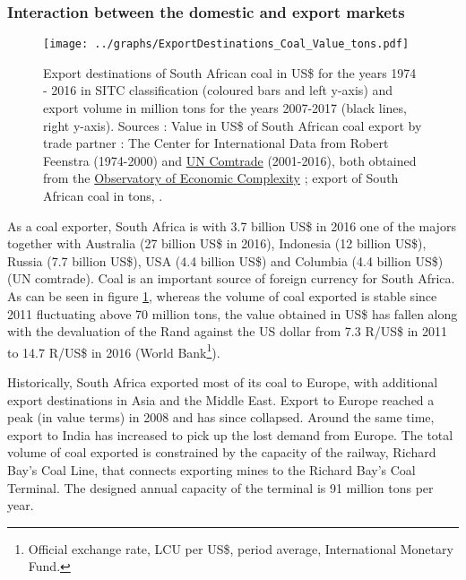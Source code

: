 \documentclass[12pt,english]{article}
\begin{document}
\subsubsection{Interaction between the domestic and export markets}

\begin{figure}[!t]
	\hspace{-20pt}\texttt{[image: ../graphs/ExportDestinations\_Coal\_Value\_tons.pdf]}
	\caption{\label{ExportDestinations_Coal}\small Export destinations of South African coal in US\$ for the years 1974 - 2016 in SITC classification (coloured bars and left y-axis) and export volume in million tons for the years 2007-2017 (black lines, right y-axis). Sources : Value in US\$ of South African coal export by trade partner : The Center for International Data from Robert Feenstra \citep{feenstra2005world} (1974-2000) and \href{https://comtrade.un.org/}{UN Comtrade} (2001-2016), both obtained from the \href{https://atlas.media.mit.edu/en/visualize/line/sitc/export/zaf/show/3222/1962.2016/}{Observatory of Economic Complexity} ; export of South African coal in tons, .}
\end{figure}

As a coal exporter, South Africa is with 3.7 billion US\$ in 2016 one of the majors together with Australia (27 billion US\$ in 2016), Indonesia (12 billion US\$), Russia (7.7 billion US\$), USA (4.4 billion US\$) and Columbia (4.4 billion US\$) (UN comtrade). Coal is an important source of foreign currency for South Africa. %
As can be seen in figure \ref{ExportDestinations_Coal}, whereas the volume of coal exported is stable since 2011 fluctuating above 70 million tons, the value obtained in US\$ has fallen along with the devaluation of the Rand against the US dollar from 7.3 R/US\$ in 2011 to 14.7 R/US\$ in 2016 (World Bank\footnote{Official exchange rate, LCU per US\$, period average, International Monetary Fund.}). 

Historically, South Africa exported most of its coal to Europe, with additional export destinations in Asia and the Middle East. Export to Europe reached a peak (in value terms) in 2008 and has since collapsed. Around the same time, export to India has increased to pick up the lost demand from Europe. The total volume of coal exported is constrained by the capacity of the railway, Richard Bay's Coal Line, that connects exporting mines to the Richard Bay's Coal Terminal. The designed annual capacity of the terminal is 91 million tons per year.
\end{document}
